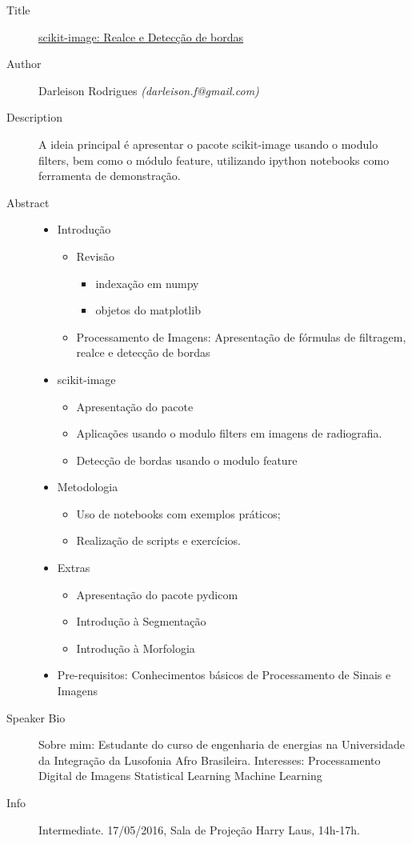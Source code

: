 \begin{description}
   \item[Title] \underline{scikit-image: Realce e Detecção de bordas}
   \item[Author] Darleison Rodrigues \emph{(darleison.f@gmail.com)}
   \item[Description] A ideia principal é apresentar o pacote scikit-image usando o modulo filters, bem como o módulo feature, utilizando ipython notebooks como ferramenta de demonstração.  
   \item[Abstract] \begin{itemize}
      \item Introdução
      \begin{itemize}
         \item Revisão
         \begin{itemize}
            \item indexação em numpy
            \item objetos do matplotlib
         \end{itemize}
         \item Processamento de Imagens: Apresentação de fórmulas de filtragem, realce e detecção de bordas
      \end{itemize}
      \item scikit-image
      \begin{itemize}
         \item Apresentação do pacote
         \item Aplicações usando o modulo filters em imagens de radiografia.
         \item Detecção de bordas usando o modulo feature
      \end{itemize}
      \item Metodologia
      \begin{itemize}
         \item Uso de notebooks com exemplos práticos;
         \item Realização de scripts e exercícios.
      \end{itemize}
      \item Extras
      \begin{itemize}
         \item Apresentação do pacote pydicom
         \item Introdução à Segmentação
         \item Introdução à Morfologia
      \end{itemize}
      \item Pre-requisitos: Conhecimentos básicos de Processamento de Sinais e Imagens
   \end{itemize}

    \item[Speaker Bio] Sobre mim: Estudante do curso de engenharia de energias na Universidade da Integração da Lusofonia Afro Brasileira. Interesses: Processamento Digital de Imagens Statistical Learning Machine Learning
    \item[Info] Intermediate. 17/05/2016, Sala de Projeção Harry Laus, 14h-17h.
\end{description} 

